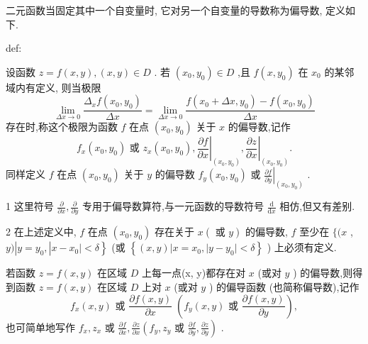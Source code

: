 二元函数当固定其中一个自变量时, 它对另一个自变量的导数称为偏导数, 定义如下.

\begin{definition}{}{def:}

\end{definition}
设函数 \(z = f\left( {x,y}\right) ,\left( {x,y}\right)  \in  D\) . 若 \(\left( {{x}_{0},{y}_{0}}\right)  \in  D\) ,且 \(f\left( {x,{y}_{0}}\right)\) 在 \({x}_{0}\) 的某邻域内有定义, 则当极限
\[
\mathop{\lim }\limits_{{{\Delta x} \rightarrow  0}}\frac{{\Delta }_{x}f\left( {{x}_{0},{y}_{0}}\right) }{\Delta x} = \mathop{\lim }\limits_{{{\Delta x} \rightarrow  0}}\frac{f\left( {{x}_{0} + {\Delta x},{y}_{0}}\right)  - f\left( {{x}_{0},{y}_{0}}\right) }{\Delta x} \tag{7}
\]
存在时,称这个极限为函数 \(f\) 在点 \(\left( {{x}_{0},{y}_{0}}\right)\) 关于 \(x\) 的偏导数,记作
\[
{f}_{x}\left( {{x}_{0},{y}_{0}}\right) \text{ 或 }{z}_{x}\left( {{x}_{0},{y}_{0}}\right) ,{\left. \frac{\partial f}{\partial x}\right| }_{\left( {x}_{0},{y}_{0}\right) },{\left. \frac{\partial z}{\partial x}\right| }_{\left( {x}_{0},{y}_{0}\right) }.
\]
同样定义 \(f\) 在点 \(\left( {{x}_{0},{y}_{0}}\right)\) 关于 \(y\) 的偏导数 \({f}_{y}\left( {{x}_{0},{y}_{0}}\right)\) 或 \({\left. \frac{\partial f}{\partial y}\right| }_{\left( {x}_{0},{y}_{0}\right) }\) .

\begin{remark}

\end{remark}
1 这里符号 \(\frac{\partial }{\partial x},\frac{\partial }{\partial y}\) 专用于偏导数算符,与一元函数的导数符号 \(\frac{\mathrm{d}}{\mathrm{d}x}\) 相仿,但又有差别.

\begin{remark}

\end{remark}
2 在上述定义中, \(f\) 在点 \(\left( {{x}_{0},{y}_{0}}\right)\) 存在关于 \(x\left( {\text{ 或 }y}\right)\) 的偏导数, \(f\) 至少在 \(\{ (x\) , \(\left. {y)\left| {y = {y}_{0},}\right| x - {x}_{0} \mid   < \delta }\right\}\) (或 \(\left\{  {\left( {x,y}\right) \left| {x = {x}_{0},}\right| y - {y}_{0} \mid   < \delta }\right\}\) ) 上必须有定义.

若函数 \(z = f\left( {x,y}\right)\) 在区域 \(D\) 上每一点(x, y)都存在对 \(x\) (或对 \(y\) ) 的偏导数,则得到函数 \(z = f\left( {x,y}\right)\) 在区域 \(D\) 上对 \(x\) (或对 \(y\) ) 的偏导函数 (也简称偏导数),记作
\[
{f}_{x}\left( {x,y}\right) \text{ 或 }\frac{\partial f\left( {x,y}\right) }{\partial x}\;\left( {{f}_{y}\left( {x,y}\right) \text{ 或 }\frac{\partial f\left( {x,y}\right) }{\partial y}}\right) ,
\]
也可简单地写作 \({f}_{x},{z}_{x}\) 或 \(\frac{\partial f}{\partial x},\frac{\partial z}{\partial x}\left( {{f}_{y},{z}_{y}}\right.\) 或 \(\left. {\frac{\partial f}{\partial y},\frac{\partial z}{\partial y}}\right)\) .

